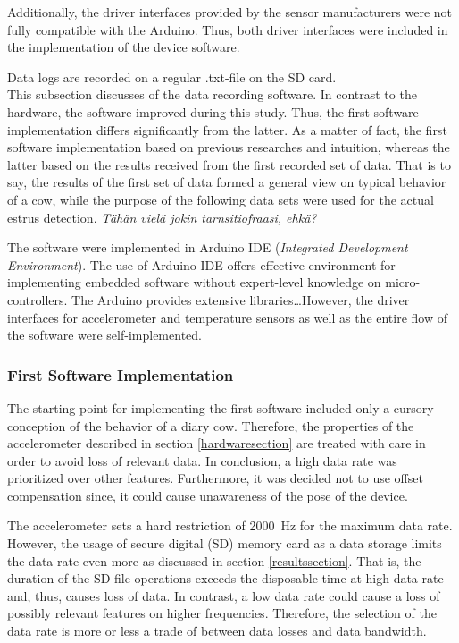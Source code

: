 \documentclass[english,12pt,a4paper,pdftex,elec,utf8]{aaltothesis}
\begin{document}
Additionally, the driver interfaces provided by the sensor manufacturers were not fully compatible with the Arduino. Thus, both driver interfaces were included in the implementation of the device software. 

Data logs are recorded on a regular .txt-file on the SD card.\\


This subsection discusses of the data recording software. In contrast to the hardware, the software improved during this study. Thus, the first software implementation differs significantly from the latter. As a matter of fact, the first software implementation based on previous researches and intuition, whereas the latter based on the results received from the first recorded set of data. That is to say, the results of the first set of data formed a general view on typical behavior of a cow, while the purpose of the following data sets were used for the actual estrus detection. \textit{Tähän vielä jokin tarnsitiofraasi, ehkä?}

The software were implemented in Arduino IDE (\textit{Integrated Development Environment}). The use of Arduino IDE offers effective environment for implementing embedded software without expert-level knowledge on micro-controllers. The Arduino provides extensive libraries\dots However, the driver interfaces for accelerometer and temperature sensors as well as the entire flow of the software were self-implemented.



\subsubsection*{First Software Implementation}\label{firstdatasetconfigurations}




The starting point for implementing the first software included only a cursory conception of the behavior of a diary cow. Therefore, the properties of the accelerometer described in section \ref{hardwaresection} are treated with care in order to avoid loss of relevant data. In conclusion, a high data rate was prioritized over other features. Furthermore, it was decided not to use offset compensation since, it could cause unawareness of the pose of the device. 

The accelerometer sets a hard restriction of \SI{2000}{\hertz} for the maximum data rate. However, the usage of secure digital (SD) memory card as a data storage limits the data rate even more as discussed in section \ref{resultssection}. That is, the duration of the SD file operations exceeds the disposable time at high data rate and, thus, causes loss of data. In contrast, a low data rate could cause a loss of possibly relevant features on higher frequencies. Therefore, the selection of the data rate is more or less a trade of between data losses and data bandwidth.
\end{document}
